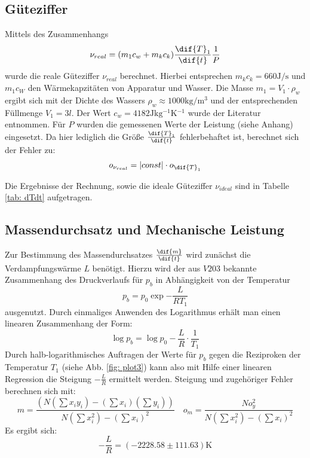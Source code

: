 \subsection{Güteziffer}

Mittels des Zusammenhangs
\begin{equation}
  \nu_{real} = (m_1 c_w + m_k c_k) \frac{\dif{T}_1}{\dif{t}} \frac{1}{P} %
\end{equation}
wurde die reale Güteziffer $\nu_{real}$ berechnet. Hierbei entsprechen $m_k c_k = 660 \si{\joule \per \second}$ und $m_1 c_W$ den Wärmekapzitäten von Apparatur und Wasser. Die Masse $m_1 = V_1 \cdot \rho_w$ ergibt sich mit
der Dichte des Wassers $\rho_w \approx 1000 \si{\kilo \gram \per \meter ^3}$  und der entsprechenden Füllmenge $V_1 = 3 l$. Der Wert $c_w = 4182\si{\joule \kilo \gram^{-1} \kelvin^{-1}}$ wurde der Literatur \cite{demtröder} entnommen.
Für $P$ wurden die gemessenen Werte der Leistung (siehe Anhang) eingesetzt.%
 Da hier lediglich die Größe $\frac{\dif{T}_1}{\dif{t}}$ fehlerbehaftet ist, berechnet sich der Fehler zu: %
\begin{equation}
  o_{\nu_{real}} = \left| const \right| \cdot o_{\dif{T}_1} %
  \label{eq: errorconst}
\end{equation}

Die Ergebnisse der Rechnung, sowie die ideale Güteziffer $\nu_{ideal}$ sind in Tabelle \ref{tab: dTdt} aufgetragen.


\subsection{Massendurchsatz und Mechanische Leistung}
Zur Bestimmung des Massendurchsatzes $\frac{\dif{m}}{\dif{t}}$ wird zunächst die Verdampfungswärme $L$ benötigt. Hierzu wird der aus $V203$ \cite{anleitung203} bekannte Zusammenhang des Druckverlaufs für $p_b$ in Abhängigkeit von der Temperatur%
\begin{equation}
  p_b = p_0 \exp{-\frac{L}{R T_1}} %
\end{equation}
ausgenutzt. Durch einmaliges Anwenden des Logarithmus erhält man einen linearen Zusammenhang der Form:
\begin{equation}
  \log{p_b} = \log{p_0} -\frac{L}{R} \cdot \frac{1}{T_1}
\end{equation}
Durch halb-logarithmisches Auftragen der Werte für $p_b$ gegen die Reziproken der Temperatur $T_1$ (siehe Abb. \ref{fig: plot3}) kann also mit Hilfe einer linearen Regression die Steigung $-\frac{L}{R}$ ermittelt werden.
Steigung und zugehöriger Fehler berechnen sich mit:
\begin{equation}
  m= \frac{\left( N  (\sum x_i y_i) - (\sum x_i)(\sum y_i)\right)}{N (\sum x_i^2)- (\sum x_i)^2 }    \quad   o_m=\frac{N o_y^2}{N (\sum x_i^2)- (\sum x_i)^2 }
\end{equation}
Es ergibt sich:
\begin{equation}
  -\frac{L}{R} =  (-2228.58 \pm 111.63) \si{\kelvin}
\end{equation}

